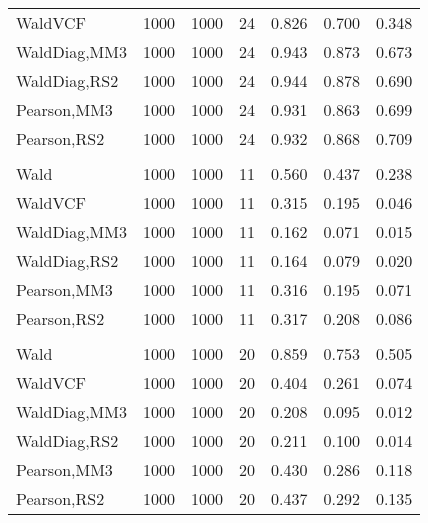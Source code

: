 \documentclass[
]{article}
\begin{document}
\begin{table}[H]
{\begin{tabular}[t]{lrrrrrr}
\hspace{1em}WaldVCF & 1000 & 1000 & 24 & 0.826 & 0.700 & 0.348\\
\hspace{1em}WaldDiag,MM3 & 1000 & 1000 & 24 & 0.943 & 0.873 & 0.673\\
\hspace{1em}WaldDiag,RS2 & 1000 & 1000 & 24 & 0.944 & 0.878 & 0.690\\
\hspace{1em}Pearson,MM3 & 1000 & 1000 & 24 & 0.931 & 0.863 & 0.699\\
\hspace{1em}Pearson,RS2 & 1000 & 1000 & 24 & 0.932 & 0.868 & 0.709\\
\addlinespace[0.3em]
\multicolumn{7}{l}{\textbf{2F 10V}}\\
\hspace{1em}Wald & 1000 & 1000 & 11 & 0.560 & 0.437 & 0.238\\
\hspace{1em}WaldVCF & 1000 & 1000 & 11 & 0.315 & 0.195 & 0.046\\
\hspace{1em}WaldDiag,MM3 & 1000 & 1000 & 11 & 0.162 & 0.071 & 0.015\\
\hspace{1em}WaldDiag,RS2 & 1000 & 1000 & 11 & 0.164 & 0.079 & 0.020\\
\hspace{1em}Pearson,MM3 & 1000 & 1000 & 11 & 0.316 & 0.195 & 0.071\\
\hspace{1em}Pearson,RS2 & 1000 & 1000 & 11 & 0.317 & 0.208 & 0.086\\
\addlinespace[0.3em]
\multicolumn{7}{l}{\textbf{3F 15V}}\\
\hspace{1em}Wald & 1000 & 1000 & 20 & 0.859 & 0.753 & 0.505\\
\hspace{1em}WaldVCF & 1000 & 1000 & 20 & 0.404 & 0.261 & 0.074\\
\hspace{1em}WaldDiag,MM3 & 1000 & 1000 & 20 & 0.208 & 0.095 & 0.012\\
\hspace{1em}WaldDiag,RS2 & 1000 & 1000 & 20 & 0.211 & 0.100 & 0.014\\
\hspace{1em}Pearson,MM3 & 1000 & 1000 & 20 & 0.430 & 0.286 & 0.118\\
\hspace{1em}Pearson,RS2 & 1000 & 1000 & 20 & 0.437 & 0.292 & 0.135\\
\bottomrule
\end{tabular}}
\endgroup{}
\end{table}
\end{document}
